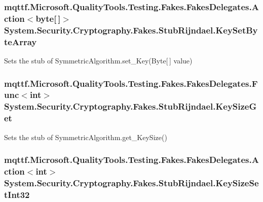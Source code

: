\hypertarget{class_system_1_1_security_1_1_cryptography_1_1_fakes_1_1_stub_rijndael_afb59709cecccbb23ceae0f03a9f68a5c}{
\subsubsection[{Key\-Set\-Byte\-Array}]{\setlength{\rightskip}{0pt plus 5cm}mqttf.\-Microsoft.\-Quality\-Tools.\-Testing.\-Fakes.\-Fakes\-Delegates.\-Action$<$byte\mbox{[}$\,$\mbox{]}$>$ System.\-Security.\-Cryptography.\-Fakes.\-Stub\-Rijndael.\-Key\-Set\-Byte\-Array}}\label{class_system_1_1_security_1_1_cryptography_1_1_fakes_1_1_stub_rijndael_afb59709cecccbb23ceae0f03a9f68a5c}


Sets the stub of Symmetric\-Algorithm.\-set\-\_\-\-Key(\-Byte\mbox{[}$\,$\mbox{]} value)

\hypertarget{class_system_1_1_security_1_1_cryptography_1_1_fakes_1_1_stub_rijndael_a55c1147ba02b71e9cffde377c8b1d24c}{
\subsubsection[{Key\-Size\-Get}]{\setlength{\rightskip}{0pt plus 5cm}mqttf.\-Microsoft.\-Quality\-Tools.\-Testing.\-Fakes.\-Fakes\-Delegates.\-Func$<$int$>$ System.\-Security.\-Cryptography.\-Fakes.\-Stub\-Rijndael.\-Key\-Size\-Get}}\label{class_system_1_1_security_1_1_cryptography_1_1_fakes_1_1_stub_rijndael_a55c1147ba02b71e9cffde377c8b1d24c}


Sets the stub of Symmetric\-Algorithm.\-get\-\_\-\-Key\-Size()

\hypertarget{class_system_1_1_security_1_1_cryptography_1_1_fakes_1_1_stub_rijndael_a9c210a4c3c167ac49ce0300242b72b57}{
\subsubsection[{Key\-Size\-Set\-Int32}]{\setlength{\rightskip}{0pt plus 5cm}mqttf.\-Microsoft.\-Quality\-Tools.\-Testing.\-Fakes.\-Fakes\-Delegates.\-Action$<$int$>$ System.\-Security.\-Cryptography.\-Fakes.\-Stub\-Rijndael.\-Key\-Size\-Set\-Int32}}\label{class_system_1_1_security_1_1_cryptography_1_1_fakes_1_1_stub_rijndael_a9c210a4c3c167ac49ce0300242b72b57}


